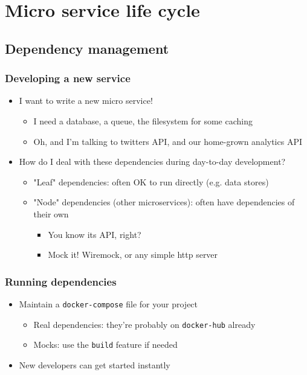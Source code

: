 \documentclass[8pt]{article}
\begin{document}
\section{Micro service life cycle}
\label{sec:org4804ab8}
\subsection{Dependency management}
\label{sec:orgbb01daf}
\subsubsection{Developing a new service}
\label{sec:orgf0f1a43}
\begin{itemize}
\item I want to write a new micro service!
\begin{itemize}
\item I need a database, a queue, the filesystem for some caching
\item Oh, and I'm talking to twitters API, and our home-grown analytics API
\end{itemize}

\item How do I deal with these dependencies during day-to-day development?
\begin{itemize}
\item "Leaf" dependencies: often OK to run directly (e.g. data stores)
\item "Node" dependencies (other microservices): often have dependencies of their own
\begin{itemize}
\item You know its API, right?
\item Mock it! Wiremock, or any simple http server
\end{itemize}
\end{itemize}
\end{itemize}

\subsubsection{Running dependencies}
\label{sec:org2f0ef5d}
\begin{itemize}
\item Maintain a \texttt{docker-compose} file for your project
\begin{itemize}
\item Real dependencies: they're probably on \texttt{docker-hub} already
\item Mocks: use the \texttt{build} feature if needed
\end{itemize}
\item New developers can get started instantly
\end{itemize}
\end{document}

